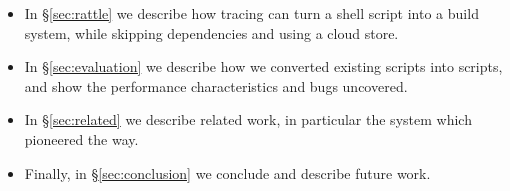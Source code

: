 \begin{itemize}
\item In \S\ref{sec:rattle} we describe how tracing can turn a shell script into a build system, while skipping dependencies and using a cloud store. %
\item In \S\ref{sec:evaluation} we describe how we converted existing \Make scripts into \Rattle scripts, and show the performance characteristics and bugs uncovered.
\item In \S\ref{sec:related} we describe related work, in particular the \Fabricate system which pioneered the way.
\item Finally, in \S\ref{sec:conclusion} we conclude and describe future work.
\end{itemize}
